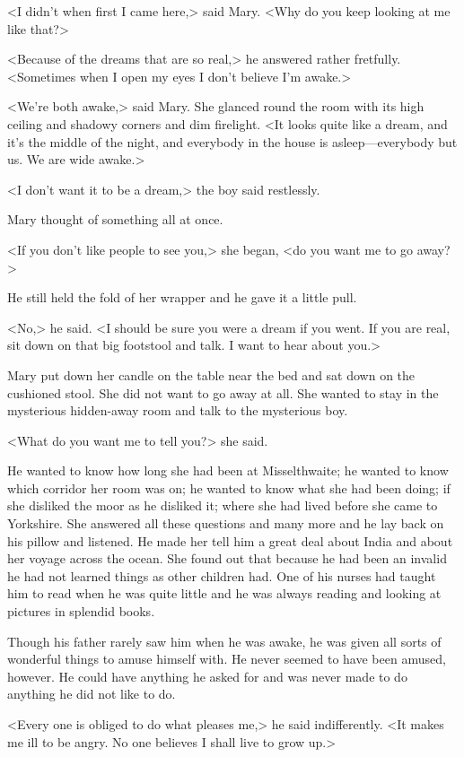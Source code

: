 <I didn't when first I came here,> said Mary. <Why do you keep looking at me like that?>

<Because of the dreams that are so real,> he answered rather fretfully. <Sometimes when I open my eyes I don't believe I'm awake.>

<We're both awake,> said Mary. She glanced round the room with its high ceiling and shadowy corners and dim firelight. <It looks quite like a dream, and it's the middle of the night, and everybody in the house is asleep—everybody but us. We are wide awake.>

<I don't want it to be a dream,> the boy said restlessly.

Mary thought of something all at once.

<If you don't like people to see you,> she began, <do you want me to go away?>

He still held the fold of her wrapper and he gave it a little pull.

<No,> he said. <I should be sure you were a dream if you went. If you are real, sit down on that big footstool and talk. I want to hear about you.>

Mary put down her candle on the table near the bed and sat down on the cushioned stool. She did not want to go away at all. She wanted to stay in the mysterious hidden-away room and talk to the mysterious boy.

<What do you want me to tell you?> she said.

He wanted to know how long she had been at Misselthwaite; he wanted to know which corridor her room was on; he wanted to know what she had been doing; if she disliked the moor as he disliked it; where she had lived before she came to Yorkshire. She answered all these questions and many more and he lay back on his pillow and listened. He made her tell him a great deal about India and about her voyage across the ocean. She found out that because he had been an invalid he had not learned things as other children had. One of his nurses had taught him to read when he was quite little and he was always reading and looking at pictures in splendid books.

Though his father rarely saw him when he was awake, he was given all sorts of wonderful things to amuse himself with. He never seemed to have been amused, however. He could have anything he asked for and was never made to do anything he did not like to do.

<Every one is obliged to do what pleases me,> he said indifferently. <It makes me ill to be angry. No one believes I shall live to grow up.>

